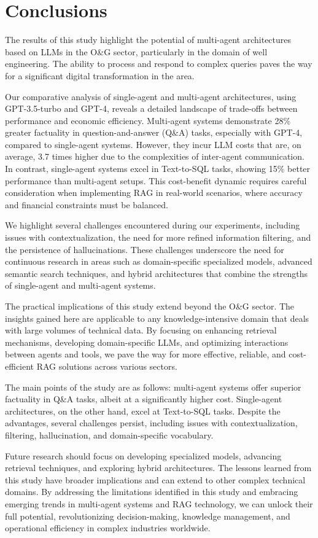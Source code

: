 \chapter{Conclusions}

    The results of this study highlight the potential of multi-agent architectures based on LLMs in the O\&G sector, particularly in the domain of well engineering. The ability to process and respond to complex queries paves the way for a significant digital transformation in the area.

    Our comparative analysis of single-agent and multi-agent architectures, using GPT-3.5-turbo and GPT-4, reveals a detailed landscape of trade-offs between performance and economic efficiency. Multi-agent systems demonstrate 28\% greater factuality in question-and-answer (Q\&A) tasks, especially with GPT-4, compared to single-agent systems. However, they incur LLM costs that are, on average, 3.7 times higher due to the complexities of inter-agent communication. In contrast, single-agent systems excel in Text-to-SQL tasks, showing 15\% better performance than multi-agent setups. This cost-benefit dynamic requires careful consideration when implementing RAG in real-world scenarios, where accuracy and financial constraints must be balanced.

    We highlight several challenges encountered during our experiments, including issues with contextualization, the need for more refined information filtering, and the persistence of hallucinations. These challenges underscore the need for continuous research in areas such as domain-specific specialized models, advanced semantic search techniques, and hybrid architectures that combine the strengths of single-agent and multi-agent systems.

    The practical implications of this study extend beyond the O\&G sector. The insights gained here are applicable to any knowledge-intensive domain that deals with large volumes of technical data. By focusing on enhancing retrieval mechanisms, developing domain-specific LLMs, and optimizing interactions between agents and tools, we pave the way for more effective, reliable, and cost-efficient RAG solutions across various sectors.

    The main points of the study are as follows: multi-agent systems offer superior factuality in Q\&A tasks, albeit at a significantly higher cost. Single-agent architectures, on the other hand, excel at Text-to-SQL tasks. Despite the advantages, several challenges persist, including issues with contextualization, filtering, hallucination, and domain-specific vocabulary.

    Future research should focus on developing specialized models, advancing retrieval techniques, and exploring hybrid architectures. The lessons learned from this study have broader implications and can extend to other complex technical domains. By addressing the limitations identified in this study and embracing emerging trends in multi-agent systems and RAG technology, we can unlock their full potential, revolutionizing decision-making, knowledge management, and operational efficiency in complex industries worldwide.